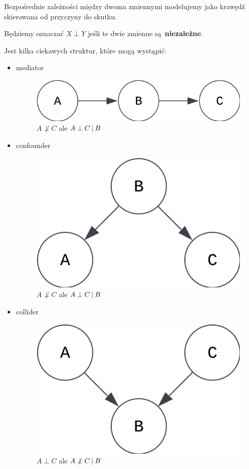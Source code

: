 Bezpośrednie zależności między dwoma zmiennymi modelujemy jako krawędź skierowana od przyczyny do skutku.

Będziemy oznaczać \( X \perp Y \) jeśli te dwie zmienne są \textbf{niezależne}.

Jest kilka ciekawych struktur, które mogą wystąpić:
\begin{itemize}
    \item mediator
    \begin{figure}[H]
        \centering
        \includegraphics{chapters/graphical models/img/mediator.png}
        \caption{\( A \not \perp C \) ale \( A \perp C \:\vert\: B \)}
    \end{figure}
    
    \item confounder
    
    \begin{figure}[H]
        \centering
        \includegraphics{chapters/graphical models/img/confounder.png}
        \caption{\( A \not \perp C \) ale \( A \perp C \:\vert\: B \) }
    \end{figure}
    
    \item collider
    \begin{figure}[H]
        \centering
        \includegraphics{chapters/graphical models/img/collider.png}
        \caption{\( A \perp C \) ale \( A \not \perp C \:\vert\: B \) }
    \end{figure}
\end{itemize}

